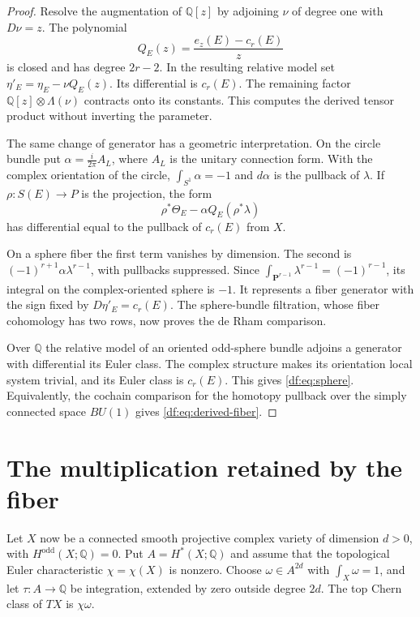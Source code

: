 \begin{proof}
Resolve the augmentation of $\mathbb Q[z]$ by adjoining
$\nu$ of degree one with $D\nu=z$. The polynomial
\[
 Q_E(z)=\frac{e_z(E)-c_r(E)}{z}
\]
is closed and has degree $2r-2$. In the resulting relative model set
$\eta'_E=\eta_E-\nu Q_E(z)$. Its differential is $c_r(E)$.
The remaining factor $\mathbb Q[z]\otimes\Lambda(\nu)$ contracts
onto its constants. This computes the derived tensor product without
inverting the parameter.

The same change of generator has a geometric interpretation. On the
circle bundle put $\alpha=\frac{i}{2\pi}A_L$, where $A_L$ is the
unitary connection form. With the complex orientation of the circle,
$\int_{S^1}\alpha=-1$ and $d\alpha$ is the pullback of $\lambda$.
If $\rho:S(E)\to P$ is the projection, the form
\[
 \rho^*\Theta_E-\alpha Q_E(\rho^*\lambda)
\]
has differential equal to the pullback of $c_r(E)$ from $X$.

On a sphere fiber the first term vanishes by dimension. The second
is $(-1)^{r+1}\alpha\lambda^{r-1}$, with pullbacks suppressed.
Since $\int_{\mathbf P^{r-1}}\lambda^{r-1}=(-1)^{r-1}$, its integral
on the complex-oriented sphere is $-1$. It represents a fiber generator
with the sign fixed by $D\eta'_E=c_r(E)$. The sphere-bundle filtration,
whose fiber cohomology has two rows, now proves the de Rham comparison.

Over $\mathbb Q$ the relative model of an oriented odd-sphere bundle
adjoins a generator with differential its Euler class. The complex
structure makes its orientation local system trivial, and its Euler
class is $c_r(E)$. This gives \eqref{df:eq:sphere}. Equivalently,
the cochain comparison for the homotopy pullback over the simply
connected space $BU(1)$ gives \eqref{df:eq:derived-fiber}.
\end{proof}

\section{The multiplication retained by the fiber}
\label{df:sec:minimal}

Let $X$ now be a connected smooth projective complex variety of
dimension $d>0$, with $H^{\mathrm{odd}}(X;\mathbb Q)=0$.
Put $A=H^*(X;\mathbb Q)$ and assume that the topological Euler
characteristic $\chi=\chi(X)$ is nonzero. Choose
$\omega\in A^{2d}$ with $\int_X\omega=1$, and let
$\tau:A\to\mathbb Q$ be integration, extended by zero outside
degree $2d$. The top Chern class of $TX$ is $\chi\omega$.

